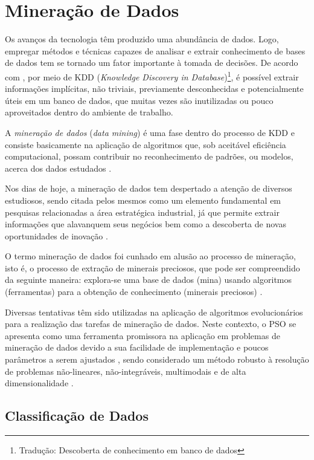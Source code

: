 \documentclass[
	12pt,				%
	openany,			%
	oneside,	
	a4paper,			%
	brazil,				%
	]{unimontes-ppgmsc-abntex2}
\begin{document}
\section{Mineração de Dados}
\label{sec:md}

Os avanços da tecnologia têm produzido uma abundância de dados. Logo, empregar métodos e técnicas capazes de analisar e extrair conhecimento de bases de dados tem se tornado um fator importante à tomada de decisões. De acordo com , por meio de KDD ({\em Knowledge Discovery in Database})\footnote{Tradução: Descoberta de conhecimento em banco de dados}, é possível extrair informações implícitas, não triviais, previamente desconhecidas e potencialmente úteis em um banco de dados, que muitas vezes são inutilizadas ou pouco aproveitados dentro do ambiente de trabalho. 

A {\em mineração de dados} ({\em data mining}) é uma fase dentro do processo de KDD e consiste basicamente na aplicação de algoritmos que, sob aceitável eficiência computacional, possam contribuir no reconhecimento de padrões, ou modelos, acerca dos dados estudados \cite{Fayyad_1996_2}. 

Nos dias de hoje, a mineração de dados tem despertado a atenção de diversos estudiosos, sendo citada pelos mesmos como um elemento fundamental em pesquisas relacionadas a área estratégica industrial, já que permite extrair informações que alavanquem seus negócios bem como a descoberta de novas oportunidades de inovação \cite{Chen_1996}.

O termo mineração de dados foi cunhado em alusão ao processo de mineração, isto é, o processo de extração de minerais preciosos, que pode ser compreendido da seguinte maneira: explora-se uma base de dados (mina) usando algoritmos (ferramentas) para a obtenção de conhecimento (minerais preciosos) \cite{Castro_2016}. 

Diversas tentativas têm sido utilizadas na aplicação de algoritmos evolucionários para a realização das tarefas de mineração de dados. Neste contexto, o PSO se apresenta como uma ferramenta promissora na aplicação em problemas de mineração de dados devido a sua facilidade de implementação e poucos parâmetros a serem ajustados \cite{Wang_2007}, sendo considerado um método robusto à resolução de problemas não-lineares, não-integráveis, multimodais e de alta dimensionalidade \cite{Krohling_2004}. 


\subsection{Classificação de Dados}
\label{sec:classif_dados}
\end{document}
